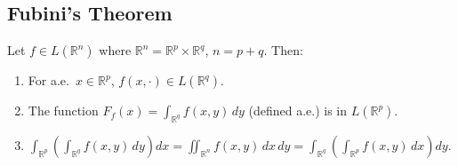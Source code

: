 \documentclass[11pt]{report}
\begin{document}
\subsection{Fubini's Theorem}

\begin{thmbox}
Let $f \in L(\mathbb{R}^n)$ where $\mathbb{R}^n = \mathbb{R}^p \times \mathbb{R}^q$, $n = p + q$. Then:
\begin{enumerate}[label=(\roman*)]
\item For a.e.\ $x \in \mathbb{R}^p$, $f(x, \cdot) \in L(\mathbb{R}^q)$.
\item The function $F_f(x) = \int_{\mathbb{R}^q} f(x, y)\,dy$ (defined a.e.) is in $L(\mathbb{R}^p)$.
\item $\displaystyle\int_{\mathbb{R}^p} \left(\int_{\mathbb{R}^q} f(x, y)\,dy\right) dx = \iint_{\mathbb{R}^n} f(x, y)\,dx\,dy = \int_{\mathbb{R}^q} \left(\int_{\mathbb{R}^p} f(x, y)\,dx\right) dy$.
\end{enumerate}
\end{thmbox}
\end{document}
